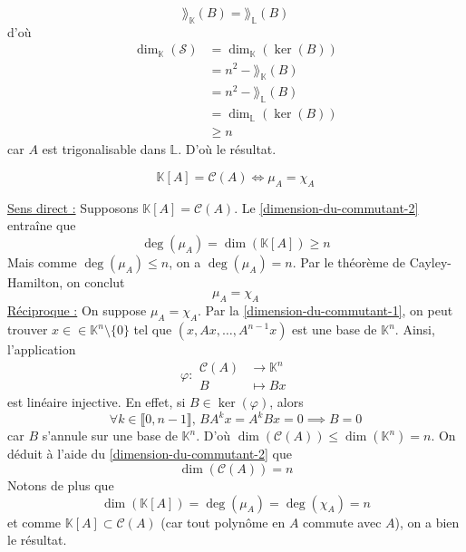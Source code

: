\begin{demonstration}
		\[ \rang_{\mathbb{K}}(B) = \rang_{\mathbb{L}}(B) \]
		d'où
		\begin{align*}
			\dim_{\mathbb{K}}(\mathcal{S}) &= \dim_{\mathbb{K}}(\ker(B)) \\
			&= n^2 - \rang_{\mathbb{K}}(B) \\
			&= n^2 - \rang_{\mathbb{L}}(B) \\
			&= \dim_{\mathbb{L}}(\ker(B)) \\
			&\geq n
		\end{align*}
		car $A$ est trigonalisable dans $\mathbb{L}$. D'où le résultat.
	\end{demonstration}

	\begin{theorem}
		\[ \mathbb{K}[A] = \mathcal{C}(A) \iff \mu_A = \chi_A \]
	\end{theorem}

	\begin{demonstration}
		\uline{Sens direct :} Supposons $\mathbb{K}[A] = \mathcal{C}(A)$. Le \cref{dimension-du-commutant-2} entraîne que
		\[ \deg(\mu_A) = \dim(\mathbb{K}[A]) \geq n \]
		Mais comme $\deg(\mu_A) \leq n$, on a $\deg(\mu_A) = n$. Par le théorème de Cayley-Hamilton, on conclut
		\[ \mu_A = \chi_A \]
		\uline{Réciproque :} On suppose $\mu_A = \chi_A$. Par la \cref{dimension-du-commutant-1}, on peut trouver $x \in \in \mathbb{K}^n \setminus \{ 0 \}$ tel que $(x, Ax, \dots, A^{n-1}x)$ est une base de $\mathbb{K}^n$. Ainsi, l'application
		\[ \varphi :
		\begin{array}{cl}
			\mathcal{C}(A) &\rightarrow \mathbb{K}^n \\
			B &\mapsto Bx
		\end{array}
		\]
		est linéaire injective. En effet, si $B \in \ker(\varphi)$, alors
		\[ \forall k \in \llbracket 0, n-1 \rrbracket, \, BA^kx = A^kBx = 0 \implies B = 0 \]
		car $B$ s'annule sur une base de $\mathbb{K}^n$. D'où $\dim(\mathcal{C}(A)) \leq \dim(\mathbb{K}^n) = n$. On déduit à l'aide du \cref{dimension-du-commutant-2} que
		\[ \dim(\mathcal{C}(A)) = n \]
		Notons de plus que
		\[ \dim(\mathbb{K}[A]) = \deg(\mu_A) = \deg(\chi_A) = n \]
		et comme $\mathbb{K}[A] \subset \mathcal{C}(A)$ (car tout polynôme en $A$ commute avec $A$), on a bien le résultat.
	\end{demonstration}

